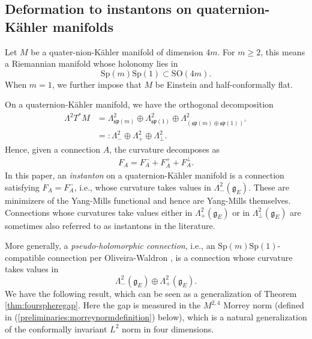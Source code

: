 \documentclass[12pt]{amsart}
\renewcommand{\1}{{\mathbf 1}}
\newcommand{\Sp}{{\mathrm{Sp} }}
\newcommand{\SO}{{\mathrm{SO} }}
\theoremstyle{others}
\numberwithin{equation}{section}
\begin{document}
\vspace{5mm}
 
\subsection{Deformation to instantons on quaternion-K\"ahler manifolds}

Let $M$ be a quater-nion-K{\"a}hler manifold of dimension $4m$. For \(m \geq 2\), this means a Riemannian manifold whose holonomy lies in
$$\Sp(m)\Sp(1) \subset \SO(4m).$$ When \(m = 1\), we further impose that \(M\) be Einstein %
and half-conformally flat. %

On a quaternion-K{\"a}hler manifold, we have the orthogonal decomposition \cite[]{oliveirawaldron}
\begin{align*}
    \Lambda^2 T^\ast M &= \Lambda_{\mathfrak{sp}(m)}^2 \oplus \Lambda_{\mathfrak{sp}(1)}^2  \oplus \Lambda_{(\mathfrak{sp}(m) \oplus \mathfrak{sp}(1))^\perp}^2 \\
    &=: \Lambda_-^2 \oplus \Lambda_+^2 \oplus \Lambda_\perp^2.
\end{align*} Hence, given a connection \(A\), the curvature decomposes as
\begin{align*}
    F_A = F_A^- + F_A^+ + F_A^\perp.
\end{align*} In this paper, an \emph{instanton} on a quaternion-K{\"a}hler manifold is a connection satisfying \(F_A = F_A^-\), i.e., whose curvature takes values in \(\Lambda_-^2(\mathfrak{g}_E)\). These are minimizers of the Yang-Mills functional and hence are Yang-Mills themselves. Connections whose curvatures take values either in \(\Lambda_+^2(\mathfrak{g}_E)\) or in \(\Lambda_{\perp}^2(\mathfrak{g}_E)\) are sometimes also referred to as instantons in the literature. \par 

More generally, a \emph{pseudo-holomorphic connection}, i.e., an \(\text{Sp}(m)\text{Sp}(1)\)-compatible connection per Oliveira-Waldron \cite[Def. 2.1]{oliveirawaldron}, is a connection whose curvature takes values in 
$$\Lambda_{-}^2(\mathfrak{g}_E) \oplus \Lambda_{+}^2(\mathfrak{g}_E).$$
We have the following result, which can be seen as a generalization of Theorem \ref{thm:fourspheregap}. Here the gap is measured in the $M^{2,4}$ Morrey norm (defined in (\ref{preliminaries:morreynormdefinition}) below), which is a natural generalization of the conformally invariant \(L^2\) norm in four dimensions.
\end{document}
